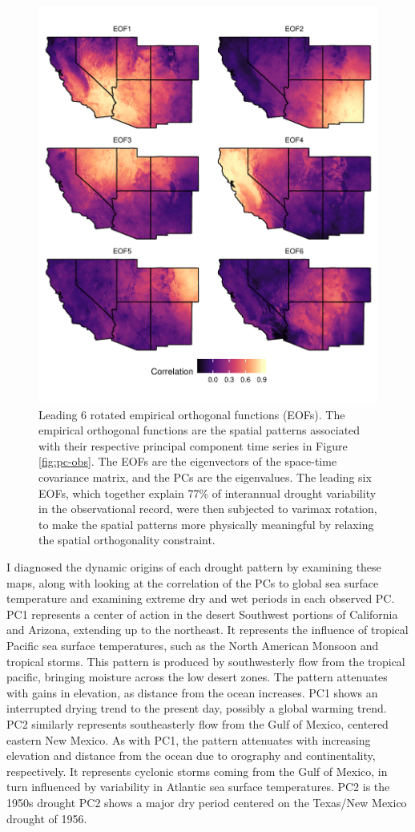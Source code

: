 \documentclass[10pt]{iopart}
\begin{document}
\begin{figure}[htbp!]
\centering
\includegraphics[width=.8\linewidth]{figures/reof_observed.pdf}
\caption{Leading 6 rotated empirical orthogonal functions (EOFs). The empirical orthogonal functions are the spatial patterns associated with their respective principal component time series in Figure \ref{fig:pc-obs}. The EOFs are the eigenvectors of the space-time covariance matrix, and the PCs are the eigenvalues. The leading six EOFs, which together explain 77\% of interannual drought variability in the observational record, were then subjected to varimax rotation, to make the spatial patterns more physically meaningful by relaxing the spatial orthogonality constraint.}
\label{fig:eofs}
\end{figure}

I diagnosed the dynamic origins of each drought pattern by examining these maps, along with looking at the correlation of the PCs to global sea surface temperature and examining extreme dry and wet periods in each observed PC.
PC1 represents a center of action in the desert Southwest portions of California and Arizona, extending up to the northeast. It represents the influence of tropical Pacific sea surface temperatures, such as the North American Monsoon and tropical storms. This pattern is produced by southwesterly flow from the tropical pacific, bringing moisture across the low desert zones. The pattern attenuates with gains in elevation, as distance from the ocean increases. PC1 shows an interrupted drying trend to the present day, possibly a global warming trend. PC2 similarly represents southeasterly flow from the Gulf of Mexico, centered eastern New Mexico. As with PC1, the pattern attenuates with increasing elevation and distance from the ocean due to orography and continentality, respectively. It represents cyclonic storms coming from the Gulf of Mexico, in turn influenced by variability in Atlantic sea surface temperatures. PC2 is the 1950s drought PC2 shows a major dry period centered on the Texas/New Mexico drought of 1956. 
\end{document}
